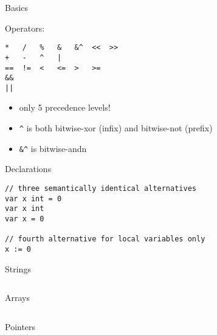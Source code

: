 \documentclass[10pt]{beamer}
\begin{document}
	
	\begin{frame}[t,fragile]{Basics}
		\begin{center}
			Operators:
		\end{center}
		\begin{verbatim}
*   /   %   &   &^  <<  >>
+   -   ^   |
==  !=  <   <=  >   >=
&&
||
		\end{verbatim}
		\vspace*{-4ex}
		\begin{itemize}
			\item only 5 precedence levels!
			\item \texttt{^} is both bitwise-xor (infix) and bitwise-not (prefix)
			\item \texttt{&^} is bitwise-andn
		\end{itemize}
\end{frame}
	
	
	\begin{frame}[t,fragile]{Declarations}
		\begin{verbatim}
// three semantically identical alternatives
var x int = 0
var x int
var x = 0

// fourth alternative for local variables only
x := 0
		\end{verbatim}
	\end{frame}

	
	\begin{frame}[t,fragile]{Strings}
		\inputminted{go}{code/02_strings.go}
	\end{frame}

	
	\begin{frame}[t,fragile]{Arrays}
		\inputminted{go}{code/03_arrays.go}
	\end{frame}

	
	\begin{frame}[t,fragile]{Pointers}
		\inputminted{go}{code/04_pointers.go}
	\end{frame}
	
\end{document}
